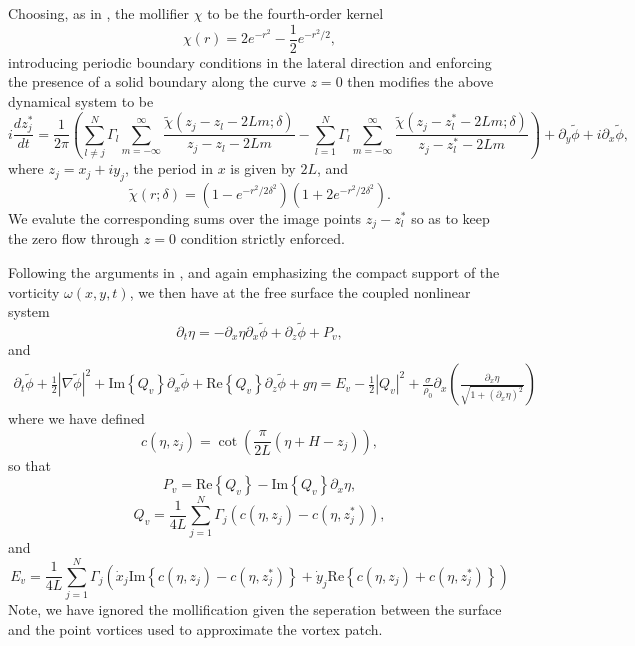 \documentclass[a4paper,11pt]{article}
\newcommand{\p}{\partial}
\begin{document}
Choosing, as in \cite{beale}, the mollifier $\chi$ to be the fourth-order kernel 
\[
\chi(r) = 2e^{-r^{2}} - \frac{1}{2}e^{-r^2/2}, 
\]
introducing periodic boundary conditions in the lateral direction and enforcing the presence of a solid boundary along the curve $z=0$ then modifies the above dynamical system to be 
\[
i\frac{d z^{\ast}_{j}}{dt}  = \frac{1}{2\pi}\left(\sum_{l\neq j}^{N} \Gamma_{l} \sum_{m=-\infty}^{\infty} \frac{\tilde{\chi}(z_{j}-z_{l}-2Lm;\delta)}{z_{j}-z_{l}-2Lm} -   \sum_{l=1}^{N} \Gamma_{l} \sum_{m=-\infty}^{\infty} \frac{\tilde{\chi}(z_{j}-z^{\ast}_{l}-2Lm;\delta)}{z_{j}-z^{\ast}_{l}-2Lm}\right)  + \p_{y}\tilde{\phi} + i\p_{x}\tilde{\phi}, 
\]
where $z_{j}=x_{j} + iy_{j}$, the period in $x$ is given by $2L$, and
\[
\tilde{\chi}(r;\delta) = \left(1-e^{-r^{2}/2\delta^{2}} \right)\left(1+2e^{-r^{2}/2\delta^{2}} \right).
\]
We evalute the corresponding sums over the image points $z_{j}-z_{l}^{\ast}$ so as to keep the zero flow through $z=0$ condition strictly enforced.  

Following the arguments in \cite{curtis}, and again emphasizing the compact support of the vorticity $\omega(x,y,t)$, we then have at the free surface the coupled nonlinear system
\[
\p_{t}\eta = -\p_{x}\eta\p_{x}\tilde{\phi} + \p_{z}\tilde{\phi} + P_{v},
\]
and
\begin{multline*}
\p_{t}\tilde{\phi} + \frac{1}{2}\left|\nabla \tilde{\phi}\right|^{2} +\mbox{Im}\left\{Q_{v}\right\}\p_{x}\tilde{\phi} + \mbox{Re}\left\{Q_{v}\right\}\p_{z}\tilde{\phi} + g\eta = E_{v} - \frac{1}{2}\left|Q_{v}\right|^{2} + \frac{\sigma}{\rho_{0}}\p_{x}\left(\frac{\p_{x}\eta}{\sqrt{1+(\p_{x}\eta)^{2}}} \right)
\end{multline*}
where we have defined
\[
c(\eta,z_{j}) = \cot\left(\frac{\pi}{2L}\left(\eta+H-z_{j}\right)\right),
\]
so that 
\[
P_{v} = \mbox{Re}\left\{Q_{v}\right\} - \mbox{Im}\left\{Q_{v}\right\}\p_{x}\eta , 
\]
\[
Q_{v} = \frac{1}{4L}\sum_{j=1}^{N}\Gamma_{j}\left(c(\eta,z_{j}) - c(\eta,z^{\ast}_{j})\right),
\]
and
\[
E_{v} = \frac{1}{4L}\sum_{j=1}^{N}\Gamma_{j}\left(\dot{x}_{j}\mbox{Im}\left\{c(\eta,z_{j})-c(\eta,z^{\ast}_{j})\right\} + \dot{y}_{j}\mbox{Re}\left\{c(\eta,z_{j})+c(\eta,z^{\ast}_{j})\right\}\right)
\]
Note, we have ignored the mollification given the seperation between the surface and the point vortices used to approximate the vortex patch.  
\end{document}
